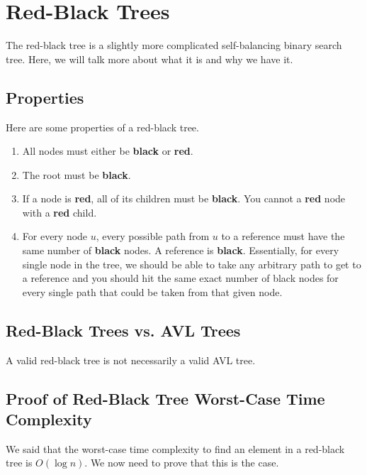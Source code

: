 \documentclass[letterpaper]{article}
\begin{document}
\newpage 
\section{Red-Black Trees}
The red-black tree is a slightly more complicated self-balancing binary search tree. Here, we will talk more about what it is and why we have it. 

\subsection{Properties}
Here are some properties of a red-black tree. 
\begin{enumerate}[(1)]
    \item All nodes must either be \textbf{black} or \textbf{red}. 
    \item The root must be \textbf{black}. 
    \item If a node is \textbf{red}, all of its children must be \textbf{black}. You cannot a \textbf{red} node with a \textbf{red} child. 
    \item For every node $u$, every possible path from $u$ to a  reference must have the same number of \textbf{black} nodes. A  reference is \textbf{black}. Essentially, for every single node in the tree, we should be able to take any arbitrary path to get to a  reference and you should hit the same exact number of black nodes for every single path that could be taken from that given node.
\end{enumerate}

\subsection{Red-Black Trees vs. AVL Trees}
A valid red-black tree is not necessarily a valid AVL tree. 

\subsection{Proof of Red-Black Tree Worst-Case Time Complexity}
We said that the worst-case time complexity to find an element in a red-black tree is $O(\log n)$. We now need to prove that this is the case. 
\end{document}
